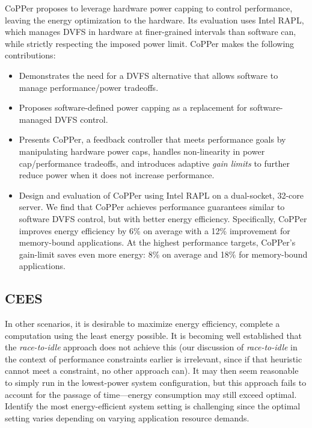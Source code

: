 CoPPer proposes to leverage hardware power capping to control performance, leaving the energy optimization to the hardware.
Its evaluation uses Intel RAPL, which manages DVFS in hardware at finer-grained intervals than software can, while strictly respecting the imposed power limit.
CoPPer makes the following contributions:
\begin{itemize}
\item Demonstrates the need for a DVFS alternative that allows software to manage performance/power tradeoffs.
\item Proposes software-defined power capping as a replacement for software-managed DVFS control.
\item Presents CoPPer, a feedback controller that meets performance goals by manipulating hardware power caps, handles non-linearity in power cap/performance tradeoffs, and introduces adaptive \emph{gain limits} to further reduce power when it does not increase performance.
\item Design and evaluation of CoPPer using Intel RAPL on a dual-socket, 32-core server.
We find that CoPPer achieves performance guarantees similar to software DVFS control, but with better energy efficiency.
Specifically, CoPPer improves energy efficiency by 6\% on average with a 12\% improvement for memory-bound applications.
At the highest performance targets, CoPPer's gain-limit saves even more energy: 8\% on average and 18\% for memory-bound applications.
\end{itemize}


\subsection{CEES}
\label{sec:intro-ee}

In other scenarios, it is desirable to maximize energy efficiency, \ie complete a computation using the least energy possible.
It is becoming well established that the \emph{race-to-idle} approach does not achieve this (our discussion of \emph{race-to-idle} in the context of performance constraints earlier is irrelevant, since if that heuristic cannot meet a constraint, no other approach can).
It may then seem reasonable to simply run in the lowest-power system configuration, but this approach fails to account for the passage of time---energy consumption may still exceed optimal.
Identify the most energy-efficient system setting is challenging since the optimal setting varies depending on varying application resource demands.

